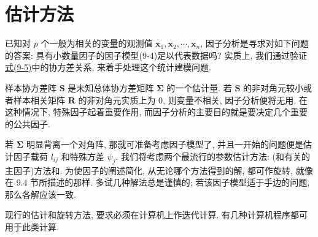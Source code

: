 
\section{估计方法}
\label{sec:9.3}

已知对 $p$ 个一般为相关的变量的观测值 $\mathbf{x}_1,\mathbf{x}_2,\cdots,\mathbf{x}_n$, 因子分析是寻求对如下问题的答案: 具有小数量因子的因子模型(9-4)足以代表数据吗? 实质上, 我们通过验证\hyperref[eq:9-5]{式(9-5)}中的协方差关系, 来着手处理这个统计建模问题.

样本协方差阵 $\mathbf{S}$ 是未知总体协方差矩阵 $\boldsymbol{\Sigma}$ 的一个估计量. 若 $\mathbf{S}$ 的非对角元较小或者样本相关矩阵 $\mathbf{R}$ 的非对角元实质上为 0, 则变量不相关, 因子分析便将无用. 在这种情况下, 特殊因子起着重要作用, 而因子分析的主要目的就是要决定几个重要的公共因子.

若 $\boldsymbol{\Sigma}$ 明显背离一个对角阵, 那就可准备考虑因子模型了, 并且一开始的问题便是估计因子载荷 $l_{ij}$ 和特殊方差 $\psi_j$. 我们将考虑两个最流行的参数估计方法: (和有关的主因子)方法和. 为使因子的阐述简化, 从无论哪个方法得到的解, 都可作旋转, 就像在 9.4 节所描述的那样. 多试几种解法总是谨慎的; 若该因子模型适于手边的问题, 那么各解应该一致.

现行的估计和旋转方法, 要求必须在计算机上作迭代计算. 有几种计算机程序都可用于此类计算.



